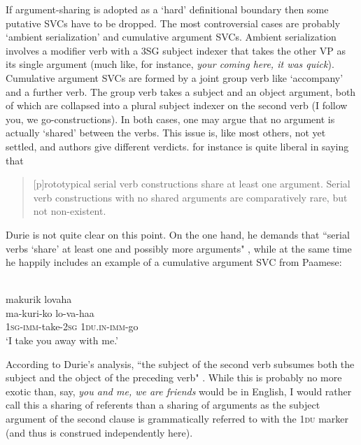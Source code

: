 If argument-sharing is adopted as a `hard' definitional boundary then some putative SVCs have to be dropped. The most controversial cases are probably `ambient serialization' and cumulative argument SVCs. Ambient serialization involves a modifier verb with a 3SG subject indexer that takes the other VP as its single argument (much like, for instance, \textit{your coming here, it was quick}). Cumulative argument SVCs are formed by a joint group verb like `accompany' and a further verb. The group verb takes a subject and an object argument, both of which are collapsed into a plural subject indexer on the second verb (I follow you, we go-constructions). In both cases, one may argue that no argument is actually `shared' between the verbs. This issue is, like most others, not yet settled, and authors give different verdicts. \citet[12]{Aikhenvald2006} for instance is quite liberal in saying that \begin{quote}[p]rototypical serial verb constructions share at least one argument. Serial verb constructions with no shared arguments are comparatively rare, but not non-existent.\end{quote}
Durie is not quite clear on this point. On the one hand, he demands that ``serial verbs `share' at least one and possibly more arguments" \citep[291]{Durie1997}, while at the same time he happily includes an example of a cumulative argument SVC from Paamese:

\ea \label{}
\\
\glll makurik lovaha \\
ma-kuri-ko lo-va-haa \\
\textsc{1}\textsc{sg}-\textsc{imm}-take-\textsc{2}\textsc{sg} \textsc{1}\textsc{du}.\textsc{in}-\textsc{imm}-go \\
\glft `I take you away with me.' \\ 
\z

According to Durie's analysis, ``the subject of the second verb subsumes both the subject and the object of the preceding verb" \citep[293]{Durie1997}. While this is probably no more exotic than, say, \textit{you and me, we are friends} would be in English, I would rather call this a sharing of referents than a sharing of arguments as the subject argument of the second clause is grammatically referred to with the 1\textsc{du} marker (and thus is construed independently here).


